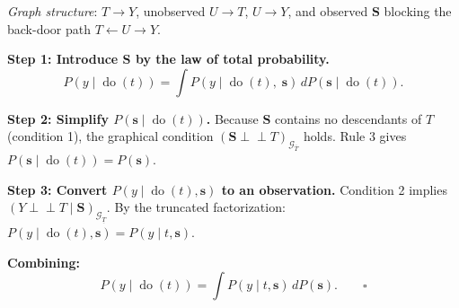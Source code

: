 \documentclass[
  a4paper,
]{book}
\newcommand{\doop}{\operatorname{do}}
\newcommand{\indep}{\perp\!\!\!\perp}
\newcommand{\Gcal}{\mathcal{G}}
\begin{document}
\begin{tcolorbox}[enhanced jigsaw, arc=.35mm, bottomrule=.15mm, bottomtitle=1mm, breakable, colback=white, colbacktitle=quarto-callout-note-color!10!white, colframe=quarto-callout-note-color-frame, coltitle=black, left=2mm, leftrule=.75mm, opacityback=0, opacitybacktitle=0.6, rightrule=.15mm, title={Proof of the Back-Door Formula (Theorem 3.1)}, titlerule=0mm, toprule=.15mm, toptitle=1mm]

\emph{Graph structure}: \(T \to Y\), unobserved \(U \to T\),
\(U \to Y\), and observed \(\mathbf{S}\) blocking the back-door path
\(T \leftarrow U \to Y\).

\textbf{Step 1: Introduce \(\mathbf{S}\) by the law of total
probability.}
\[P(y \mid \doop(t)) = \int P(y \mid \doop(t),\;\mathbf{s})\,dP(\mathbf{s} \mid \doop(t)).\]

\textbf{Step 2: Simplify \(P(\mathbf{s} \mid \doop(t))\).} Because
\(\mathbf{S}\) contains no descendants of \(T\) (condition 1), the
graphical condition \((\mathbf{S} \indep T)_{\Gcal_{\overline{T}}}\)
holds. Rule 3 gives \(P(\mathbf{s} \mid \doop(t)) = P(\mathbf{s})\).

\textbf{Step 3: Convert \(P(y \mid \doop(t), \mathbf{s})\) to an
observation.} Condition 2 implies
\((Y \indep T \mid \mathbf{S})_{\Gcal_{\underline{T}}}\). By the
truncated factorization:
\(P(y \mid \doop(t), \mathbf{s}) = P(y \mid t, \mathbf{s})\).

\textbf{Combining:}
\[P(y \mid \doop(t)) = \int P(y \mid t, \mathbf{s})\,dP(\mathbf{s}). \qquad \square\]

\end{tcolorbox}
\end{document}
